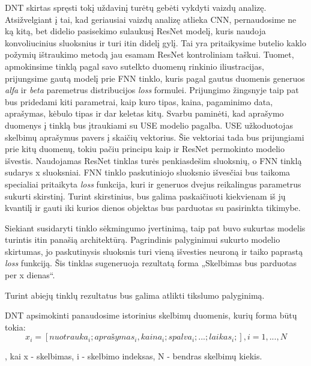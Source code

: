 \documentclass{VUMIFPSkursinis}
\begin{document}
DNT skirtas spręsti tokį uždavinį turėtų gebėti vykdyti vaizdų analizę. Atsižvelgiant į tai, kad geriausiai vaizdų analizę atlieka CNN, pernaudosime ne ką kitą, bet didelio pasisekimo sulaukusį ResNet modelį, kuris naudoja konvoliucinius sluoksnius ir turi itin didelį gylį. Tai yra pritaikysime butelio kaklo požymių ištraukimo metodą jau esamam ResNet kontroliniam taškui. Tuomet, apmokinsime tinklą pagal savo sutelkto duomenų rinkinio iliustracijas, prijungsime gautą modelį prie FNN tinklo, kuris pagal gautus duomenis generuos \textit{alfa} ir \textit{beta} paremetrus distribucijos \textit{loss} formulei. Prijungimo žingsnyje taip pat bus pridedami kiti parametrai, kaip kuro tipas, kaina, pagaminimo data, aprašymas, kėbulo tipas ir dar keletas kitų. Svarbu paminėti, kad aprašymo duomenys į tinklą bus įtraukiami su USE modelio pagalba. USE užkoduotojas skelbimų aprašymus pavers į skaičių vektorius. Šie vektoriai tada bus prijungiami prie kitų duomenų, tokiu pačiu principu kaip ir ResNet permokinto modelio išvestis. Naudojamas ResNet tinklas turės penkiasdešim sluoksnių, o FNN tinklą sudarys x sluoksniai. FNN tinklo paskutiniojo sluoksnio išvesčiai bus taikoma specialiai pritaikyta \textit{loss} funkcija, kuri ir generuos dvejus reikalingus parametrus sukurti skirstinį. Turint skirstinius, bus galima paskaičiuoti kiekvienam iš jų kvantilį ir gauti iki kurios dienos objektas bus parduotas su pasirinkta tikimybe.

Siekiant susidaryti tinklo sėkmingumo įvertinimą, taip pat buvo sukurtas modelis turintis itin panašią architektūrą. Pagrindinis palyginimui sukurto modelio skirtumas, jo paskutinysis sluoksnis turi vieną išvesties neuroną ir taiko paprastą \textit{loss} funkciją. Šis tinklas sugeneruoja rezultatą forma „Skelbimas bus parduotas per x dienas“.

Turint abiejų tinklų rezultatus bus galima atlikti tikslumo palyginimą.

DNT apsimokinti panaudosime istorinius skelbimų duomenis, kurių forma būtų tokia: 
\begin{equation}
  x_i = [nuotrauka_i; aprašymas_i, kaina_i; spalva_i; ... ; laikas_i;], i = 1, ... , N
\end{equation}

, kai x - skelbimas, i - skelbimo indeksas, N - bendras skelbimų kiekis.


\end{document}
